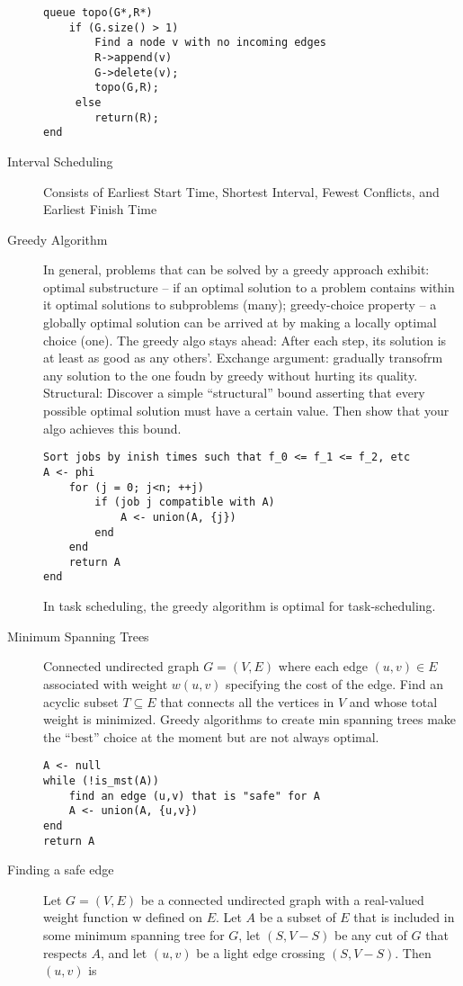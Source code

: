 \documentclass[8pt]{article}
\begin{document}
\begin{multicols}{2}
\begin{description}
\begin{verbatim}
queue topo(G*,R*)
    if (G.size() > 1)
        Find a node v with no incoming edges
        R->append(v)
        G->delete(v);
        topo(G,R);
     else
        return(R);
end
\end{verbatim}
  \item[Interval Scheduling] Consists of Earliest Start Time, Shortest
    Interval, Fewest Conflicts, and Earliest Finish Time
  \item[Greedy Algorithm] In general, problems that can be solved by a
    greedy approach exhibit: optimal substructure -- if an optimal
    solution to a problem contains within it optimal solutions to
    subproblems (many); greedy-choice property -- a globally optimal
    solution can be arrived at by making a locally optimal choice
    (one). The greedy algo stays ahead: After each step, its solution
    is at least as good as any others'. Exchange argument: gradually
    transofrm any solution to the one foudn by greedy without hurting
    its quality. Structural: Discover a simple ``structural'' bound
    asserting that every possible optimal solution must have a certain
    value. Then show that your algo achieves this bound.
\begin{verbatim}
Sort jobs by inish times such that f_0 <= f_1 <= f_2, etc
A <- phi
    for (j = 0; j<n; ++j)
        if (job j compatible with A)
            A <- union(A, {j})
        end
    end
    return A
end
\end{verbatim}
In task scheduling, the greedy algorithm is optimal for task-scheduling.
\item[Minimum Spanning Trees] Connected undirected graph $G=(V,E)$
  where each edge $(u,v) \in E$ associated with weight $w(u,v)$
  specifying the cost of the edge. Find an acyclic subset $T
  \subseteq E$ that connects all the vertices in $V$ and whose total
  weight is minimized. Greedy algorithms to create min spanning trees
  make the ``best'' choice at the moment but are not always optimal.
\begin{verbatim}
A <- null
while (!is_mst(A))
    find an edge (u,v) that is "safe" for A
    A <- union(A, {u,v})
end
return A
\end{verbatim}
\item[Finding a safe edge] Let $G = (V, E)$ be a connected undirected
  graph with a real-valued weight function w defined on $E$. Let $A$
  be a subset of $E$ that is included in some minimum spanning tree
  for $G$, let $(S, V − S)$ be any cut of $G$ that respects $A$, and
  let $(u, v)$ be a light edge crossing $(S, V − S)$. Then $(u, v)$ is

\end{description}
\end{multicols}
\end{document}

